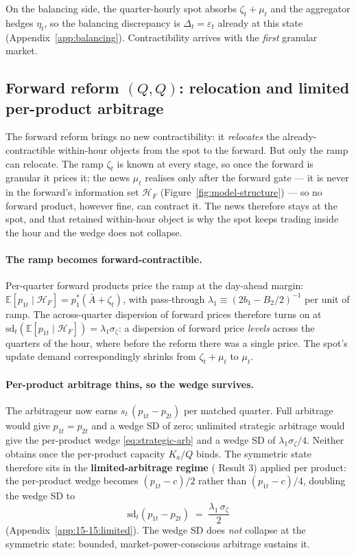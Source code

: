 \documentclass[11pt,a4paper]{article}
\theoremstyle{definition}
\theoremstyle{remark}
\theoremstyle{plain}
\begin{document}
On the balancing side, the quarter-hourly spot absorbs $\zeta_t + \mu_t$ and the aggregator hedges $\eta_t$, so the balancing discrepancy is $\Delta_t = \varepsilon_t$ already at this state (Appendix~\ref{app:balancing}). Contractibility arrives with the \emph{first} granular market.

\subsection{Forward reform $(Q,Q)$: relocation and limited per-product arbitrage}\label{sec:theory:da15}

The forward reform brings no new contractibility: it \emph{relocates} the already-contractible within-hour objects from the spot to the forward. But only the ramp can relocate. The ramp $\zeta_t$ is known at every stage, so once the forward is granular it prices it; the news $\mu_t$ realises only after the forward gate --- it is never in the forward's information set $\mathcal{H}_F$ (Figure~\ref{fig:model-structure}) --- so no forward product, however fine, can contract it. The news therefore stays at the spot, and that retained within-hour object is why the spot keeps trading inside the hour and the wedge does not collapse.

\paragraph{The ramp becomes forward-contractible.} Per-quarter forward products price the ramp at the day-ahead margin: $\mathbb{E}[p_{1t} \mid \mathcal{H}_F] = p_1^*(\bar A + \zeta_t)$, with pass-through $\lambda_1 \equiv (2 b_1 - B_2/2)^{-1}$ per unit of ramp. The across-quarter dispersion of forward prices therefore turns on at $\mathrm{sd}_t(\mathbb{E}[p_{1t} \mid \mathcal{H}_F]) = \lambda_1 \sigma_\zeta$: a dispersion of forward price \emph{levels} across the quarters of the hour, where before the reform there was a single price. The spot's update demand correspondingly shrinks from $\zeta_t + \mu_t$ to $\mu_t$.

\paragraph{Per-product arbitrage thins, so the wedge survives.} The arbitrageur now earns $s_t\,(p_{1t} - p_{2t})$ per matched quarter. Full arbitrage would give $p_{1t} = p_{2t}$ and a wedge SD of zero; unlimited strategic arbitrage would give the per-product wedge \eqref{eq:strategic-arb} and a wedge SD of $\lambda_1 \sigma_\zeta / 4$. Neither obtains once the per-product capacity $K_a/Q$ binds. The symmetric state therefore sits in the \textbf{limited-arbitrage regime} (\citeauthor{ito_reguant_2016} Result 3) applied per product: the per-product wedge becomes $(p_{1t}-c)/2$ rather than $(p_{1t}-c)/4$, doubling the wedge SD to
\begin{equation}
\boxed{\;\mathrm{sd}_t(p_{1t} - p_{2t}) \;=\; \frac{\lambda_1\, \sigma_\zeta}{2}\;}
\label{eq:wedge-sd-limited}
\end{equation}
(Appendix~\ref{app:15-15:limited}). The wedge SD does \emph{not} collapse at the symmetric state: bounded, market-power-conscious arbitrage sustains it.
\end{document}
